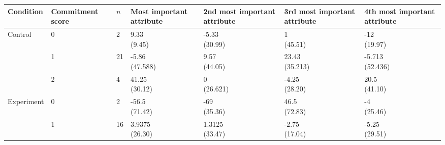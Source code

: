 



\begin{table*}
  \centering

  \begingroup
    \small
    \begin{tabularx}{\textwidth}{XXXXXXX}
      \toprule
      
      Condition
      &
      Commit\-ment score
      &
      $n$
      &
      Most important attribute
      &
      2nd most important attribute
      &
      3rd most important attribute
      &
      4th most important attribute
      \\

      \midrule
      
      Control
      &
      0
      &
      2
      & \cellcontent{9.33\\(9.45)}
      & \cellcontent{-5.33\\(30.99)}
      & \cellcontent{1\\(45.51)}
      & \cellcontent{-12\\(19.97)}
      \\
      
      &
      1
      &
      21
      & \cellcontent{-5.86\\(47.588)}
      & \cellcontent{9.57\\(44.05)}
      & \cellcontent{23.43\\(35.213)}
      & \cellcontent{-5.713\\(52.436)}
      \\
      
      &
      2
      &
      4
      & \cellcontent{41.25\\(30.12)}
      & \cellcontent{0\\(26.621)}
      & \cellcontent{-4.25\\(28.20)}
      & \cellcontent{20.5\\(41.10)}
      \\
      
      
      Experiment
      &
      0
      &
      2
      & \cellcontent{-56.5\\(71.42)}
      & \cellcontent{-69\\(35.36)}
      & \cellcontent{46.5\\(72.83)}
      & \cellcontent{-4\\(25.46)}
      \\
      
      &
      1
      &
      16
      & \cellcontent{3.9375\\(26.30)}
      & \cellcontent{1.3125\\(33.47)}
      & \cellcontent{-2.75\\(17.04)}
      & \cellcontent{-5.25\\(29.51)}
      \\
      

\end{tabularx}
\end{table*}

